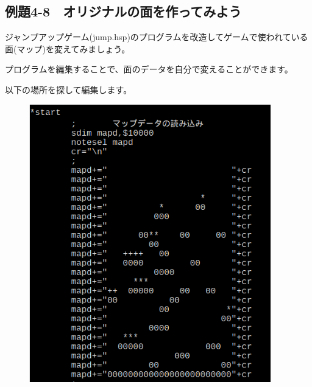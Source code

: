 \newpage
\subsection{例題4-8　オリジナルの面を作ってみよう}


\begin{description}
    \item {}
\end{description}

ジャンプアップゲーム(jump.hsp)のプログラムを改造してゲームで使われている面(マップ)を変えてみましょう。

プログラムを編集することで、面のデータを自分で変えることができます。

以下の場所を探して編集します。


\begin{figure}[H]
    \begin{center}
      \includegraphics[keepaspectratio,width=10.478cm,height=12.07cm]{text04-img/text04-img025.png}
    \end{center}
    \label{fig:prog_menu}
\end{figure}



\begin{description}
    \item {}
    \item {}
    \item {}
\end{description}

